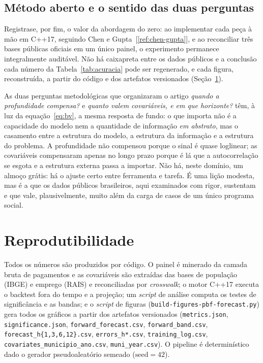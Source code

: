 \documentclass[12pt,a4paper,oneside]{article}
\newcommand{\C}[1]{[\ref{#1}]}
\begin{document}
\subsection{Método aberto e o sentido das duas perguntas}

Registra\-se, por fim, o valor da abordagem do zero: ao implementar cada
peça à mão em C++17, seguindo Chen e Gupta~\C{ref:chen-gupta}, e ao
reconciliar três bases públicas oficiais em um único painel, o experimento
permanece integralmente auditável. Não há caixa\-preta entre os dados
públicos e a conclusão \textemdash{} cada número da Tabela~\ref{tab:acuracia}
pode ser regenerado, e cada figura, reconstruída, a partir do código e dos
artefatos versionados (Seção~\ref{sec:reprod}).

As duas perguntas metodológicas que organizaram o artigo \textemdash{}
\emph{quando a profundidade compensa?} e \emph{quanto valem covariáveis, e
em que horizonte?} \textemdash{} têm, à luz da
equação~\eqref{eq:bv}, a mesma resposta de fundo: o que importa não é a
capacidade do modelo nem a quantidade de informação \emph{em abstrato}, mas
o casamento entre a estrutura do modelo, a estrutura da informação e a
estrutura do problema. A profundidade não compensou porque o sinal é quase
log\-linear; as covariáveis compensaram apenas no longo prazo porque é lá
que a autocorrelação se esgota e a estrutura externa passa a importar. Não
há, neste domínio, um almoço grátis: há o ajuste certo entre ferramenta e
tarefa. É uma lição modesta, mas é a que os dados públicos brasileiros, aqui
examinados com rigor, sustentam \textemdash{} e que vale, plausivelmente,
muito além da carga de casos de um único programa social.

\section{Reprodutibilidade}
\label{sec:reprod}

Todos os números são produzidos por código. O painel é minerado da camada
bruta de pagamentos e as covariáveis são extraídas das bases de população
(IBGE) e emprego (RAIS) e reconciliadas por \emph{crosswalk}; o motor C++17
executa o backtest fora do tempo e a projeção; um \emph{script} de análise
computa os testes de significância e as bandas; e o \emph{script} de
figuras (\texttt{build-figures-pbf-forecast.py}) gera todos os gráficos a
partir dos artefatos versionados (\texttt{metrics.json},
\texttt{significance.json}, \texttt{forward\_forecast.csv},
\texttt{forward\_band.csv}, \texttt{forecast\_h\{1,3,6,12\}.csv},
\texttt{errors\_h*.csv}, \texttt{training\_log.csv},
\texttt{covariates\_municipio\_ano.csv}, \texttt{muni\_year.csv}). O
pipeline é determinístico dado o gerador pseudoaleatório semeado
($\text{seed}=42$).
\end{document}
